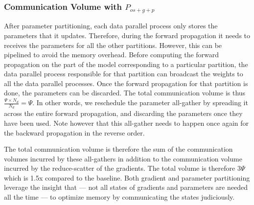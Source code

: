 \documentclass{article}
\begin{document}
\subsubsection{Communication Volume with $P_{os+g+p}$ } 
After parameter partitioning, each data parallel process only stores the parameters that it updates. Therefore, during the forward propagation it needs to receives the parameters for all the other partitions. However, this can be pipelined to avoid the memory overhead. Before computing the forward propagation on the part of the model corresponding to a particular partition, the data parallel process responsible for that partition can broadcast the weights to all the data parallel processes. Once the forward propagation for that partition is done, the parameters can be discarded. The total communication volume is thus $\frac{\Psi \times N_d}{N_d} = \Psi$. In other words, we reschedule the parameter all-gather by spreading it across the entire forward propagation, and discarding the parameters once they have been used. Note however that this all-gather needs to happen once again for the backward propagation in the reverse order. 

The total communication volume is therefore the sum of the communication volumes incurred by these all-gathers in addition to the communication volume incurred by the reduce-scatter of the gradients. The total volume is therefore $3\Psi$ which is 1.5x compared to the baseline.   Both gradient and parameter partitioning leverage the insight that --- not all states of gradients and parameters are needed all the time --- to optimize memory by communicating the states judiciously. 

\end{document}
